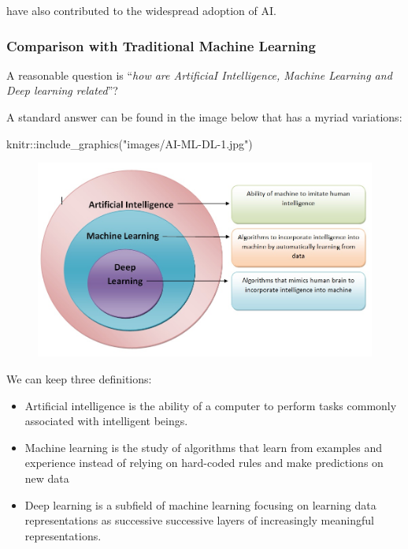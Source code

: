 \documentclass[
  letterpaper,
  DIV=11,
  numbers=noendperiod,
  oneside]{scrartcl}
\newenvironment{Shaded}{\begin{snugshade}}{\end{snugshade}}
\newcommand{\FunctionTok}[1]{\textcolor[rgb]{0.28,0.35,0.67}{#1}}
\newcommand{\NormalTok}[1]{\textcolor[rgb]{0.00,0.23,0.31}{#1}}
\newcommand{\SpecialCharTok}[1]{\textcolor[rgb]{0.37,0.37,0.37}{#1}}
\newcommand{\StringTok}[1]{\textcolor[rgb]{0.13,0.47,0.30}{#1}}
\begin{document}
have also contributed to the widespread adoption of AI.

\hypertarget{comparison-with-traditional-machine-learning}{%
\subsubsection{Comparison with Traditional Machine
Learning}\label{comparison-with-traditional-machine-learning}}

A reasonable question is ``\emph{how are ArtificiaI Intelligence,
Machine Learning and Deep learning related}''?

A standard answer can be found in the image below that has a myriad
variations:

\begin{Shaded}
\begin{Highlighting}[]
\NormalTok{knitr}\SpecialCharTok{::}\FunctionTok{include\_graphics}\NormalTok{(}\StringTok{"images/AI{-}ML{-}DL{-}1.jpg"}\NormalTok{)}
\end{Highlighting}
\end{Shaded}

\begin{figure}[H]

{\centering \includegraphics[width=1\textwidth,height=\textheight]{images/AI-ML-DL-1.jpg}

}

\end{figure}

We can keep three definitions:

\begin{itemize}
\item
  Artificial intelligence is the ability of a computer to perform tasks
  commonly associated with intelligent beings.
\item
  Machine learning is the study of algorithms that learn from examples
  and experience instead of relying on hard-coded rules and make
  predictions on new data
\item
  Deep learning is a subfield of machine learning focusing on learning
  data representations as successive successive layers of increasingly
  meaningful representations.
\end{itemize}
\end{document}
